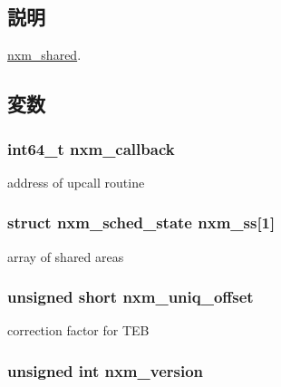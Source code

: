 \subsection{説明}
\hyperlink{structTru64_1_1nxm__shared}{nxm\_\-shared}. 

\subsection{変数}
\hypertarget{structTru64_1_1nxm__shared_a3e280a023ffa784d26a4f41306d718f0}{
\subsubsection[{nxm\_\-callback}]{\setlength{\rightskip}{0pt plus 5cm}int64\_\-t {\bf nxm\_\-callback}}}
\label{structTru64_1_1nxm__shared_a3e280a023ffa784d26a4f41306d718f0}


address of upcall routine \hypertarget{structTru64_1_1nxm__shared_a7bd02c4884a470c89958d25e45f3e34c}{
\subsubsection[{nxm\_\-ss}]{\setlength{\rightskip}{0pt plus 5cm}struct {\bf nxm\_\-sched\_\-state} {\bf nxm\_\-ss}\mbox{[}1\mbox{]}}}
\label{structTru64_1_1nxm__shared_a7bd02c4884a470c89958d25e45f3e34c}


array of shared areas \hypertarget{structTru64_1_1nxm__shared_a3b5f76b3e0f76058019240a3c5dcaec1}{
\subsubsection[{nxm\_\-uniq\_\-offset}]{\setlength{\rightskip}{0pt plus 5cm}unsigned short {\bf nxm\_\-uniq\_\-offset}}}
\label{structTru64_1_1nxm__shared_a3b5f76b3e0f76058019240a3c5dcaec1}


correction factor for TEB \hypertarget{structTru64_1_1nxm__shared_a70d8998193fec354ad484f497c870676}{
\subsubsection[{nxm\_\-version}]{\setlength{\rightskip}{0pt plus 5cm}unsigned int {\bf nxm\_\-version}}}
\label{structTru64_1_1nxm__shared_a70d8998193fec354ad484f497c870676}


